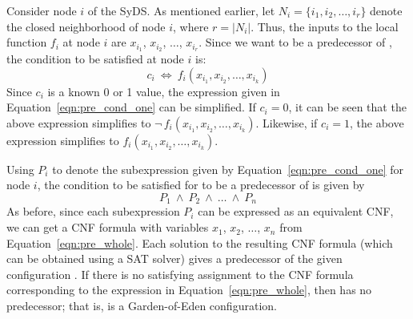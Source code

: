 Consider node $i$ of the SyDS. 
As mentioned earlier, let $N_i = \{i_1, i_2, \ldots, i_r\}$
denote the closed neighborhood of node $i$, where $r = |N_i|$.
Thus, the inputs to the local function $f_i$ at node $i$
are $x_{i_1}$, $x_{i_2}$, $\ldots$,  $x_{i_r}$.
Since we want \calcp{} to be a predecessor of \calc, the condition to
be satisfied at node $i$ is:
\begin{equation}\label{eqn:pre_cond_one}
     c_i  ~\Leftrightarrow~ f_i(x_{i_1}, x_{i_2}, \ldots,  x_{i_k})
\end{equation}
Since $c_i$ is a known 0 or 1 value, the expression given 
in Equation~\eqref{eqn:pre_cond_one} can be simplified.
If $c_i = 0$, it can be seen that the above expression 
simplifies to $\neg\,f_i(x_{i_1}, x_{i_2}, \ldots,  x_{i_k})$.
Likewise, if $c_i = 1$, the above expression 
simplifies to $f_i(x_{i_1}, x_{i_2}, \ldots,  x_{i_k})$.

Using $P_i$ to denote the subexpression given by Equation~\eqref{eqn:pre_cond_one}
for node $i$, the condition to be satisfied for \calcp{} to be a 
predecessor of \calc{} is given by 
\begin{equation}\label{eqn:pre_whole}
P_1 ~\wedge~ P_2 ~\wedge~ \ldots ~\wedge~ P_n
\end{equation}
As before, since each subexpression $P_i$ can be expressed as an equivalent CNF, 
we can get a CNF formula with variables $x_1$, $x_2$, $\ldots$, $x_n$
from Equation~\eqref{eqn:pre_whole}. 
Each solution to the resulting CNF formula (which can be obtained using
a SAT solver) gives a predecessor of the given configuration \calc.
If there is no satisfying assignment to the CNF formula corresponding
to the expression in Equation~\eqref{eqn:pre_whole}, then \calc{}
has no predecessor; that is, \calc{} is a Garden-of-Eden configuration.


